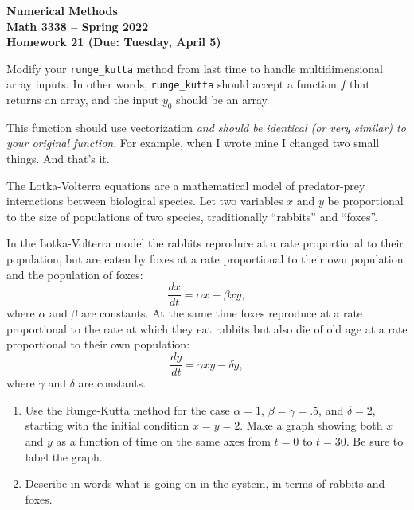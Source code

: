 \documentclass[11pt,letterpaper]{article}
\newcommand{\semester}{Spring 2022}
\newcommand{\due}{Tuesday, April 5}
\begin{document}
\newpage

\begin{center}
{\huge{\bf  Numerical Methods}} \\[1.5ex]
{\bf Math 3338 -- \semester}\\[1.5ex]
{\Large{\bf Homework 21 (Due: \due)}}\\
\end{center}
\vspace{2mm}


\begin{problem}
 Modify your \texttt{runge\_kutta} method from last time to handle multidimensional array inputs. 
In other words, \texttt{runge\_kutta} should accept a function $f$ that returns an array, and the
input $y_0$ should be an array.

This function should use vectorization \emph{and should be identical (or very similar) to your
original function}. For example, when I wrote mine I changed two small things. And that's it.
\end{problem}



\begin{problem}
 The Lotka-Volterra equations are a mathematical model of predator-prey interactions between
biological species. Let two variables $x$ and $y$ be proportional to the size of populations of
two species, traditionally ``rabbits'' and ``foxes''. 

In the Lotka-Volterra model the rabbits reproduce at a rate proportional to their population, but
are eaten by foxes at a rate proportional to their own population and the population of foxes:
\[
\frac{dx}{dt} = \alpha x - \beta xy,
\]
where $\alpha$ and $\beta$ are constants. At the same time foxes reproduce at a rate proportional to the 
rate at which they eat rabbits but also die of old age at a rate proportional to their own 
population:
\[
 \frac{dy}{dt} = \gamma xy - \delta y,
\]
where $\gamma$ and $\delta$ are constants.
\begin{enumerate}
 \item Use the Runge-Kutta method for the case $\alpha=1$, $\beta=\gamma=.5$, and $\delta = 2$,
starting with the initial condition $x=y=2$. Make a graph showing both $x$ and $y$ as a function
of time on the same axes from $t=0$ to $t=30$. Be sure to label the graph.
 \item Describe in words what is going on in the system, in terms of rabbits and foxes.
\end{enumerate}

\end{problem}
\end{document}
